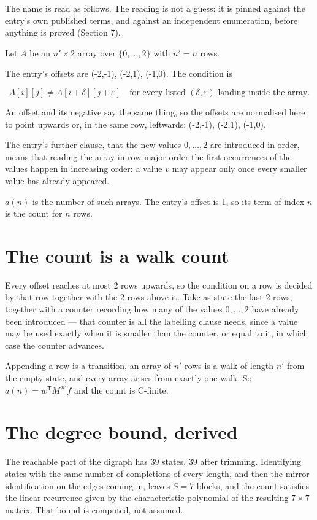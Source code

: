 \documentclass[11pt]{article}
\theoremstyle{definition}
\begin{document}
The name is read as follows. The reading is not a guess: it is pinned against the entry's own published terms, and against an independent enumeration, before anything is proved (Section 7).

Let $A$ be an $n' \times 2$ array over $\{0,\dots,2\}$ with $n' = n$ rows.

The entry's offsets are (-2,-1), (-2,1), (-1,0). The condition is

\[A[i][j] \ne A[i{+}\delta][j{+}\varepsilon]\quad\text{for every listed }(\delta,\varepsilon)\text{ landing inside the array.}\]

An offset and its negative say the same thing, so the offsets are normalised here to point upwards or, in the same row, leftwards: (-2,-1), (-2,1), (-1,0).

The entry's further clause, that the new values $0,\dots,2$ are introduced in order, means that reading the array in row-major order the first occurrences of the values happen in increasing order: a value $v$ may appear only once every smaller value has already appeared.

$a(n)$ is the number of such arrays. The entry's offset is 1, so its term of index $n$ is the count for $n$ rows.

\section{The count is a walk count}

Every offset reaches at most $2$ rows upwards, so the condition on a row is decided by that row together with the $2$ rows above it. Take as state the last $2$ rows, together with a counter recording how many of the values $0,\dots,2$ have already been introduced --- that counter is all the labelling clause needs, since a value may be used exactly when it is smaller than the counter, or equal to it, in which case the counter advances.

Appending a row is a transition, an array of $n'$ rows is a walk of length $n'$ from the empty state, and every array arises from exactly one walk. So $a(n) = w^{\mathsf T}M^{\,n'}f$ and the count is C-finite.

\section{The degree bound, derived}

The reachable part of the digraph has $39$ states, $39$ after trimming. Identifying states with the same number of completions of every length, and then the mirror identification on the edges coming in, leaves $S = 7$ blocks, and the count satisfies the linear recurrence given by the characteristic polynomial of the resulting $7\times7$ matrix. That bound is computed, not assumed.
\end{document}
